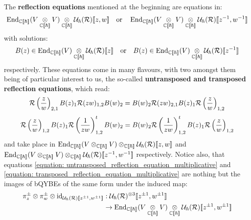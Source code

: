         The \textbf{reflection equations} mentioned at the beginning are equations in:
            $$\End_{\bbC[\![\hbar]\!]}( V \tensor_{\bbC[\![\hbar]\!]} V ) \tensor_{\bbC[\![\hbar]\!]} \calU_{\hbar}(\calR)[\![z, w]\!] \quad \text{or} \quad \End_{\bbC[\![\hbar]\!]}( V \tensor_{\bbC[\![\hbar]\!]} V ) \tensor_{\bbC[\![\hbar]\!]} \calU_{\hbar}(\calR)[\![z^{-1}, w^{-1}]\!]$$
        with solutions:
            \begin{equation} \label{equation: type_A_multiplicative_boundary_monodromy_matrices}
                B(z) \in \End_{\bbC[\![\hbar]\!]}(V) \tensor_{\bbC[\![\hbar]\!]} \calU_{\hbar}(\calR)[\![z]\!] \quad \text{or} \quad B(z) \in \End_{\bbC[\![\hbar]\!]}(V) \tensor_{\bbC[\![\hbar]\!]} \calU_{\hbar}(\calR)[\![z^{-1}]\!]
            \end{equation}
        respectively. These equations come in many flavours, with two amongst them being of particular interest to us, the so-called \textbf{untransposed and transposed reflection equations}, which read:
            \begin{equation} \label{equation: untransposed_reflection_equation_multiplicative}
                \mathcal{R}\left(\frac{z}{w}\right)_{2, 1} B(z)_1 \mathcal{R}(zw)_{1, 2} B(w)_2 = B(w)_2 \mathcal{R}(zw)_{2, 1} B(z)_1 \mathcal{R}\left(\frac{z}{w}\right)_{1, 2}
            \end{equation}
            \begin{equation} \label{equation: transposed_reflection_equation_multiplicative}
                \mathcal{R}\left(\frac{z}{w}\right)_{1, 2} B(z)_1 \mathcal{R}\left(\frac{1}{zw}\right)_{1, 2}^t B(w)_2 = B(w)_2 \mathcal{R}\left(\frac{1}{zw}\right)_{1, 2}^t B(z)_1 \mathcal{R}\left(\frac{z}{w}\right)_{1, 2}
            \end{equation}
        and take place in $\End_{\bbC[\![\hbar]\!]}( V \tensor_{\bbC[\![\hbar]\!]} V ) \tensor_{\bbC[\![\hbar]\!]} \calU_{\hbar}(\calR)[\![z, w]\!]$ and $\End_{\bbC[\![\hbar]\!]}( V \tensor_{\bbC[\![\hbar]\!]} V ) \tensor_{\bbC[\![\hbar]\!]} \calU_{\hbar}(\calR)[\![z^{-1}, w^{-1}]\!]$ respectively. Notice also, that equations \eqref{equation: untransposed_reflection_equation_multiplicative} and \eqref{equation: transposed_reflection_equation_multiplicative} are nothing but the images of bQYBEs of the same form under the induced map:
            $$
                \begin{aligned}
                    \pi_z^{\pm} \tensor \pi_w^{\pm} \tensor \id_{\calU_{\hbar}(\calR)[\![z^{\pm 1}, w^{\pm 1}]\!]} & : \calU_{\hbar}(\calR)^{\tensor 3}[\![z^{\pm 1}, w^{\pm 1}]\!]
                    \\
                    & \to \End_{\bbC[\![\hbar]\!]}( V \tensor_{\bbC[\![\hbar]\!]} V ) \tensor_{\bbC[\![\hbar]\!]} \calU_{\hbar}(\calR)[\![z^{\pm 1}, w^{\pm 1}]\!]
                \end{aligned}
            $$
